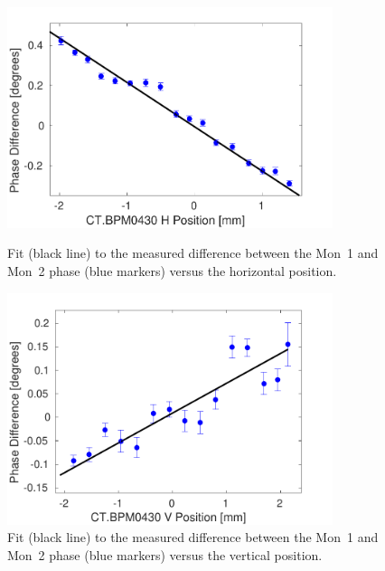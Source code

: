 \begin{figure}
  \centering
  \includegraphics[width=0.85\textwidth]{Figures/phaseMons/horizontalScanFit}
  \caption{Fit (black line) to the measured difference between the Mon~1 and Mon~2 phase (blue markers) versus the horizontal position.}
  \label{f:horizontalScanFit}
  \includegraphics[width=0.85\textwidth]{Figures/phaseMons/verticalScanFit}
  \caption{Fit (black line) to the measured difference between the Mon~1 and Mon~2 phase (blue markers) versus the vertical position.}
  \label{f:verticalScanFit}
\end{figure}


